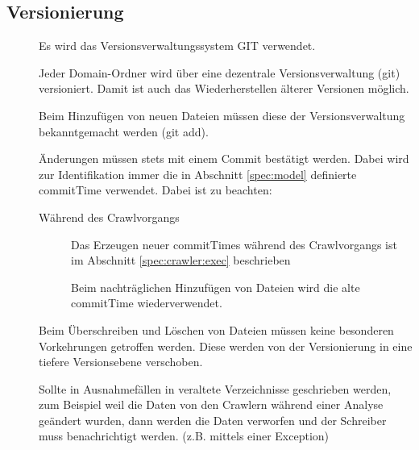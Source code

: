 \subsection{Versionierung}
\begin{description}
	\item []
		Es wird das Versionsverwaltungssystem GIT verwendet.
	\item []	
		Jeder Domain-Ordner wird über eine dezentrale Versionsverwaltung (git) versioniert. 
		Damit ist auch das Wiederherstellen älterer Versionen möglich.
	\item []
		Beim Hinzufügen von neuen Dateien müssen diese der Versionsverwaltung bekanntgemacht werden (git add).
	\item []
		Änderungen müssen stets mit einem Commit bestätigt werden.
		Dabei wird zur Identifikation immer die in Abschnitt \ref{spec:model} 
		definierte commitTime verwendet.
		Dabei ist zu beachten:
		\begin{description}
			\item [Während des Crawlvorgangs]
				Das Erzeugen neuer commitTimes während des Crawlvorgangs ist 
				im Abschnitt \ref{spec:crawler:exec} beschrieben
			\item []
				Beim nachträglichen Hinzufügen von Dateien wird die alte commitTime wiederverwendet.
		\end{description}
	\item []
		Beim Überschreiben und Löschen von Dateien müssen keine besonderen Vorkehrungen getroffen werden.
		Diese werden von der Versionierung in eine tiefere Versionsebene verschoben.
	\item []
		Sollte in Ausnahmefällen in veraltete Verzeichnisse geschrieben werden, 
		zum Beispiel weil die Daten von den Crawlern während einer Analyse geändert wurden,
		dann werden die Daten verworfen und der Schreiber muss benachrichtigt werden.
		(z.B. mittels einer Exception)
\end{description}


